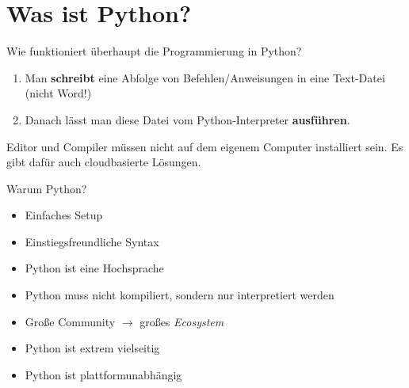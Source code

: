 \section{Was ist Python?}

\begin{frame}

\begin{block}{Wie funktioniert überhaupt die Programmierung in Python?}
	
	\begin{enumerate}
		\item Man \textbf{schreibt} eine Abfolge von Befehlen/Anweisungen in eine Text-Datei (nicht Word!) 
		\item Danach lässt man diese Datei vom Python-Interpreter \textbf{ausführen}. 
	\end{enumerate}
\end{block}
\end{frame}

\begin{frame}
\pause 
Editor und Compiler müssen nicht auf dem eigenem Computer installiert sein. Es gibt dafür auch cloudbasierte Lösungen. 
\end{frame}

\begin{frame}
	\begin{block}{Warum Python?}
		\begin{itemize}
			\item Einfaches Setup
			\item Einstiegsfreundliche Syntax
			\item Python ist eine Hochsprache
			\item Python muss nicht kompiliert, sondern nur interpretiert werden
			\item Große Community $\rightarrow$ großes \emph{Ecosystem}
			\item Python ist extrem vielseitig
			\item Python ist plattformunabhängig
		\end{itemize}
	\end{block}
\end{frame}

